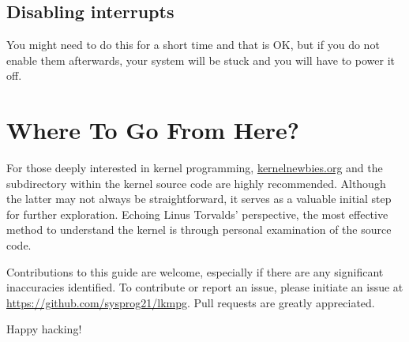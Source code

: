 \documentclass[10pt, oneside]{book}
\begin{document}
\subsection{Disabling interrupts}
\label{sec:disabling_interrupts}
You might need to do this for a short time and that is OK, but if you do not enable them afterwards, your system will be stuck and you will have to power it off.

\section{Where To Go From Here?}
\label{sec:where_to_go}
For those deeply interested in kernel programming,
\href{https://kernelnewbies.org}{kernelnewbies.org} and the  subdirectory within the kernel source code are highly recommended.
Although the latter may not always be straightforward, it serves as a valuable initial step for further exploration.
Echoing Linus Torvalds' perspective, the most effective method to understand the kernel is through personal examination of the source code.

Contributions to this guide are welcome, especially if there are any significant inaccuracies identified.
To contribute or report an issue, please initiate an issue at \url{https://github.com/sysprog21/lkmpg}.
Pull requests are greatly appreciated.

Happy hacking!
\end{document}
